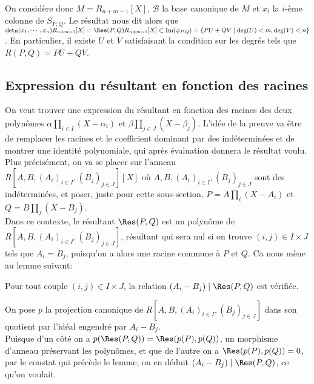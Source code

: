 \documentclass{article}
\begin{document}
\begin{preuve}
    On considère donc $M = R_{n+m-1}[X]$, $\mathcal{B}$ la base canonique de $M$ et $x_i$ la $i$-ème colonne de $S_{P, Q}$. Le résultat nous dit alors que $\det_{\mathcal{B}}(x_1, \cdots, x_n)R_{n+m-1}[X] = \Res(P, Q)R_{n+m-1}[X] \subset \Im(\varphi_{P, Q}) = \{PU + QV \mid \deg(U) < m, \deg(V) < n\}$. En particulier, il existe $U$ et $V$ satisfaisant la condition sur les degrés tels que $R(P, Q) = PU + QV$.
\end{preuve}

\subsection{Expression du résultant en fonction des racines}
On veut trouver une expression du résultant en fonction des racines des deux polynômes $\alpha \prod_{i \in I}{(X-\alpha_i)}$ et $\beta\prod_{j \in J}{(X-\beta_j)}$. L'idée de la preuve va être de remplacer les racines et le coefficient dominant par des indéterminées et de montrer une identité polynomiale, qui après évaluation donnera le résultat voulu.\\

Plus précisément, on va se placer sur l'anneau $R[A, B, (A_i)_{i \in I}, (B_j)_{j \in J}][X]$ où $A, B, (A_i)_{i \in I}, (B_j)_{j \in J}$ sont des indéterminées, et poser, juste pour cette sous-section, $P = A\prod_{i}{(X-A_i)}$ et $Q = B\prod_{j}{(X-B_j)}$.\\


Dans ce contexte, le résultant $\Res(P, Q)$ est un polynôme de $R[A, B, (A_i)_{i \in I}, (B_j)_{j \in J}]$, résultant qui sera nul si on trouve $(i, j) \in I \times J$ tels que $A_i = B_j$, puisqu'on a alors une racine commune à $P$ et $Q$. Ca nous mène au lemme suivant:

\begin{lemme}
    Pour tout couple $(i, j) \in I \times J$, la relation $(A_i - B_j) \mid \Res(P, Q)$ est vérifiée.
\end{lemme}

\begin{preuve}
    On pose $p$ la projection canonique de $R[A, B, (A_i)_{i \in I}, (B_j)_{j \in J}]$ dans son quotient par l'idéal engendré par $A_i - B_j$.\\
    Puisque d'un côté on a $p(\Res(P, Q)) = \Res(p(P), p(Q))$, un morphisme d'anneau préservant les polynômes, et que de l'autre on a $\Res(p(P), p(Q)) = 0$, par le constat qui précède le lemme, on en déduit $(A_i - B_j) \mid \Res(P, Q)$, ce qu'on voulait.
\end{preuve}
\end{document}
